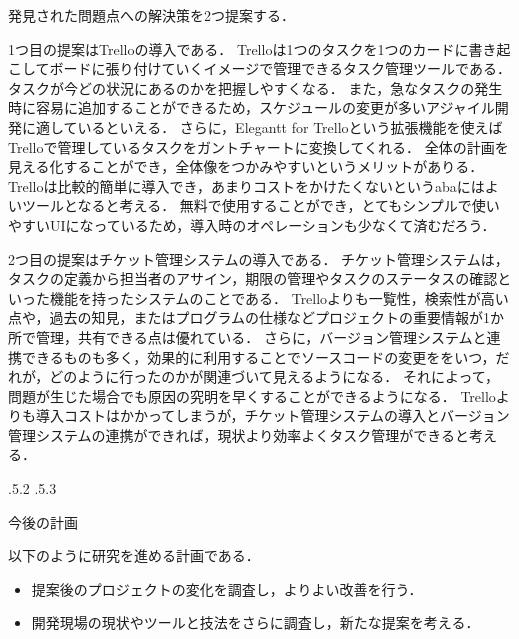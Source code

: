 \documentclass[uplatex]{jsarticle}
\makeatletter
\renewcommand{\section}{%
    \if@slide\clearpage\fi
    \@startsection{section}{1}{\z@}%
    {\Cvs \@plus.5\Cdp \@minus.2\Cdp}%
    {.5\Cvs \@plus.3\Cdp}%
    {\normalfont\raggedright}}
\makeatother
\begin{document}
発見された問題点への解決策を2つ提案する．

1つ目の提案はTrelloの導入である．
Trelloは1つのタスクを1つのカードに書き起こしてボードに張り付けていくイメージで管理できるタスク管理ツールである．
タスクが今どの状況にあるのかを把握しやすくなる．
また，急なタスクの発生時に容易に追加することができるため，スケジュールの変更が多いアジャイル開発に適しているといえる．
さらに，Elegantt for Trelloという拡張機能を使えばTrelloで管理しているタスクをガントチャートに変換してくれる．
全体の計画を見える化することができ，全体像をつかみやすいというメリットがありる．
Trelloは比較的簡単に導入でき，あまりコストをかけたくないというabaにはよいツールとなると考える．
無料で使用することができ，とてもシンプルで使いやすいUIになっているため，導入時のオペレーションも少なくて済むだろう．

2つ目の提案はチケット管理システムの導入である\cite{ikeda2014}．
チケット管理システムは，タスクの定義から担当者のアサイン，期限の管理やタスクのステータスの確認といった機能を持ったシステムのことである．
Trelloよりも一覧性，検索性が高い点や，過去の知見，またはプログラムの仕様などプロジェクトの重要情報が1か所で管理，共有できる点は優れている．
さらに，バージョン管理システムと連携できるものも多く，効果的に利用することでソースコードの変更ををいつ，だれが，どのように行ったのかが関連づいて見えるようになる．
それによって，問題が生じた場合でも原因の究明を早くすることができるようになる．
Trelloよりも導入コストはかかってしまうが，チケット管理システムの導入とバージョン管理システムの連携ができれば，現状より効率よくタスク管理ができると考える．



\section{今後の計画}

以下のように研究を進める計画である．
\begin{itemize}
\item 提案後のプロジェクトの変化を調査し，よりよい改善を行う．
\item 開発現場の現状やツールと技法をさらに調査し，新たな提案を考える．
\end{itemize}



\end{document}
